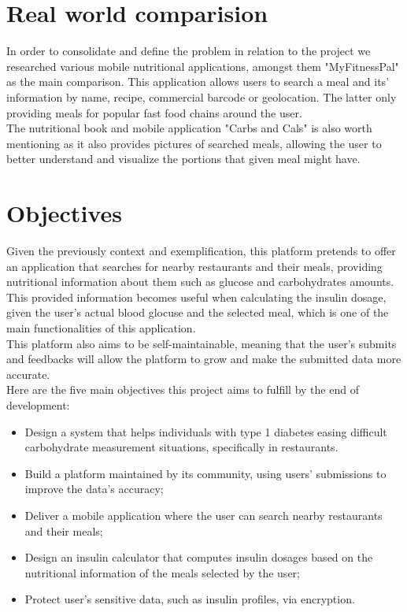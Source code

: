 \newpage
\section{Real world comparision}

In order to consolidate and define the problem in relation to the project we
researched various mobile nutritional applications, amongst them "MyFitnessPal" as the main comparison.
This application allows users to search a meal and its' information by name, recipe, commercial barcode or geolocation. The latter
only providing meals for popular fast food chains around the user.\\

The nutritional book and mobile application "Carbs and Cals" is also worth mentioning as it also provides pictures 
of searched meals, allowing the user to better understand and visualize the portions that given meal might have.

\section{Objectives}

Given the previously context and exemplification, this platform pretends to offer an application that searches for 
nearby restaurants and their meals, providing nutritional information about them such as glucose and carbohydrates amounts.
This provided information becomes useful when calculating the insulin dosage, given the user's actual blood glocuse 
and the selected meal, which is one of the main functionalities of this application.\\

This platform also aims to be self-maintainable, meaning that the user's submits and feedbacks will allow the platform to grow
and make the submitted data more accurate.\\ 

Here are the five main objectives this project aims to fulfill by the end of development:\\

\begin{itemize}
    \item Design a system that helps individuals with type 1 diabetes easing difficult carbohydrate measurement situations, specifically in restaurants.
    \item Build a platform maintained by its community, using users' submissions to improve the data's accuracy;
    \item Deliver a mobile application where the user can search nearby restaurants and their meals;
    \item Design an insulin calculator that computes insulin dosages based on the nutritional information of the meals selected by the user;
    \item Protect user's sensitive data, such as insulin profiles, via encryption.
\end{itemize}